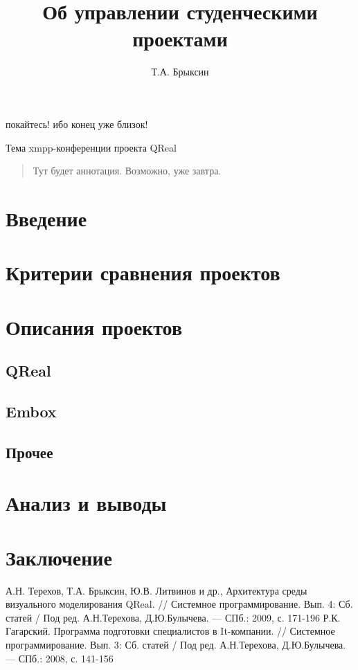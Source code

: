 \documentclass[a5paper]{article}
\title{Об управлении студенческими проектами}
\author{Т.А. Брыксин}
\date{}
\begin{document}
\maketitle
\thispagestyle{empty}

\epigraph{покайтесь! ибо конец уже близок!}%
         {Тема xmpp-конференции проекта QReal}

\begin{quote}
\small\noindent
Тут будет аннотация. Возможно, уже завтра.
\end{quote}

\section*{Введение}

\section{Критерии сравнения проектов}

\section{Описания проектов}
\subsection{QReal}
\subsection{Embox}
\subsection{Прочее}

\section{Анализ и выводы}

\section*{Заключение}

\pagebreak

\begin{thebibliography}{9000}
   А.Н. Терехов, Т.А. Брыксин, Ю.В. Литвинов и др., Архитектура среды визуального моделирования QReal. // Системное 
программирование. Вып. 4: Сб. статей / Под ред. А.Н.Терехова, Д.Ю.Булычева. --- СПб.: 2009, с. 171-196
   Р.К. Гагарский. Программа подготовки специалистов в It-компании. // Системное 
программирование. Вып. 3: Сб. статей / Под ред. А.Н.Терехова, Д.Ю.Булычева. --- СПб.: 2008, с. 141-156
\end{thebibliography}
  
\end{document}

